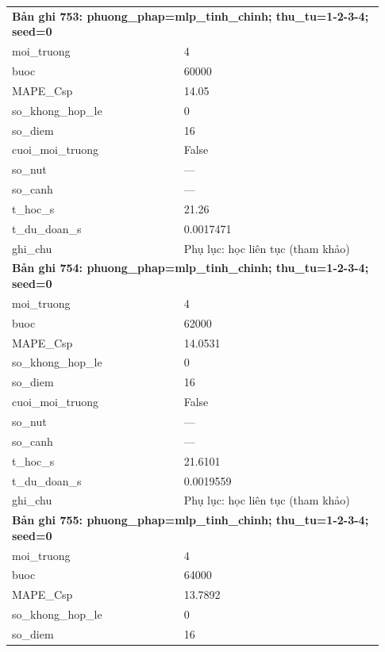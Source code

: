 \begin{longtable}{p{0.43\linewidth}p{0.50\linewidth}}
\midrule
\multicolumn{2}{p{0.95\linewidth}}{\textbf{Bản ghi 753: phuong\_phap=mlp\_tinh\_chinh; thu\_tu=1-2-3-4; seed=0}} \\
moi\_\allowbreak truong & 4 \\
buoc & 60000 \\
MAPE\_\allowbreak Csp & 14.05 \\
so\_\allowbreak khong\_\allowbreak hop\_\allowbreak le & 0 \\
so\_\allowbreak diem & 16 \\
cuoi\_\allowbreak moi\_\allowbreak truong & False \\
so\_\allowbreak nut & — \\
so\_\allowbreak canh & — \\
t\_\allowbreak hoc\_\allowbreak s & 21.26 \\
t\_\allowbreak du\_\allowbreak doan\_\allowbreak s & 0.0017471 \\
ghi\_\allowbreak chu & Phụ lục: học liên tục (tham khảo) \\
\midrule
\multicolumn{2}{p{0.95\linewidth}}{\textbf{Bản ghi 754: phuong\_phap=mlp\_tinh\_chinh; thu\_tu=1-2-3-4; seed=0}} \\
moi\_\allowbreak truong & 4 \\
buoc & 62000 \\
MAPE\_\allowbreak Csp & 14.0531 \\
so\_\allowbreak khong\_\allowbreak hop\_\allowbreak le & 0 \\
so\_\allowbreak diem & 16 \\
cuoi\_\allowbreak moi\_\allowbreak truong & False \\
so\_\allowbreak nut & — \\
so\_\allowbreak canh & — \\
t\_\allowbreak hoc\_\allowbreak s & 21.6101 \\
t\_\allowbreak du\_\allowbreak doan\_\allowbreak s & 0.0019559 \\
ghi\_\allowbreak chu & Phụ lục: học liên tục (tham khảo) \\
\midrule
\multicolumn{2}{p{0.95\linewidth}}{\textbf{Bản ghi 755: phuong\_phap=mlp\_tinh\_chinh; thu\_tu=1-2-3-4; seed=0}} \\
moi\_\allowbreak truong & 4 \\
buoc & 64000 \\
MAPE\_\allowbreak Csp & 13.7892 \\
so\_\allowbreak khong\_\allowbreak hop\_\allowbreak le & 0 \\
so\_\allowbreak diem & 16 \\

\end{longtable}
